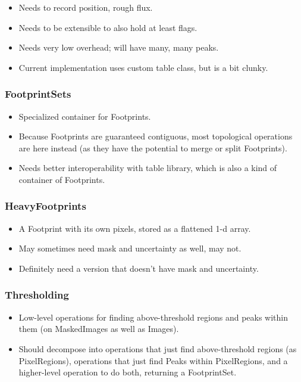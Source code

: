 \begin{itemize}
\item Needs to record position, rough flux.
\item Needs to be extensible to also hold at least flags.
\item Needs very low overhead; will have many, many peaks.
\item Current implementation uses custom table class, but is a bit clunky.
\end{itemize}

\subsubsection{FootprintSets}
\label{sec:spFootprintsSets}

\begin{itemize}
\item Specialized container for Footprints.
\item Because Footprints are guaranteed contiguous, most topological operations are here instead (as they have the potential to merge or split Footprints).
\item Needs better interoperability with table library, which is also a kind of container of Footprints.
\end{itemize}

\subsubsection{HeavyFootprints}
\label{sec:spFootprintsHeavy}

\begin{itemize}
\item A Footprint with its own pixels, stored as a flattened 1-d array.
\item May sometimes need mask and uncertainty as well, may not.
\item Definitely need a version that doesn't have mask and uncertainty.
\end{itemize}


\subsubsection{Thresholding}
\label{sec:spFootprintsThresholding}

\begin{itemize}
\item Low-level operations for finding above-threshold regions and peaks within them (on MaskedImages as well as Images).
\item Should decompose into operations that just find above-threshold regions (as PixelRegions), operations that just find Peaks within PixelRegions, and a higher-level operation to do both, returning a FootprintSet.
\end{itemize}

